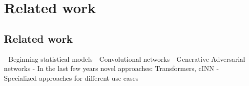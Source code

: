 \chapter{Related work}


\section{Related work}
    
- Beginning statistical models
- Convolutional networks
- Generative Adversarial networks
- In the last few years novel approaches: Transformers, cINN
- Specialized approaches for different use cases